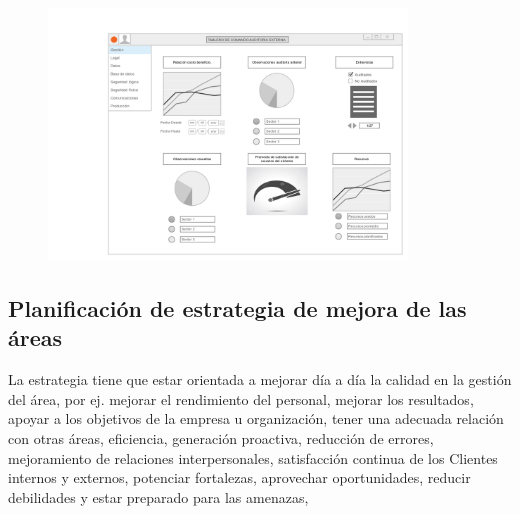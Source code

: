     \begin{figure}[h]
	  \centering
  	  \includegraphics[width=0.85\textwidth]{img/tp2_integrador/auditoria_externa}
      \label{Auditoría externa}
	\end{figure}
    
    \subsection{Planificación de estrategia de mejora de las áreas}
    La estrategia tiene que estar orientada a mejorar día a día la calidad en la gestión del área, por ej. mejorar el rendimiento del personal, mejorar los resultados, apoyar a los objetivos de la empresa u organización, tener una adecuada relación con otras áreas,  eficiencia, generación proactiva, reducción de errores, mejoramiento de relaciones interpersonales, satisfacción continua de los Clientes internos y externos, potenciar fortalezas, aprovechar oportunidades, reducir debilidades y estar preparado para las amenazas, 

